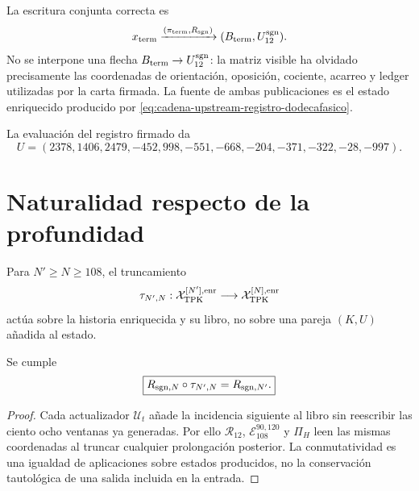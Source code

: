 La escritura conjunta correcta es
\begin{equation}
 x_{\rm term}
 \xrightarrow{(\pi_{\rm term},R_{\rm sgn})}
 (B_{\rm term},U_{12}^{\rm sgn}).
 \label{eq:doble-publicacion-terminal}
\end{equation}
No se interpone una flecha
\(B_{\rm term}\to U_{12}^{\rm sgn}\): la matriz visible ha olvidado
precisamente las coordenadas de orientación, oposición, cociente, acarreo y
ledger utilizadas por la carta firmada. La fuente de ambas publicaciones es
el estado enriquecido producido por \eqref{eq:cadena-upstream-registro-dodecafasico}.

La evaluación del registro firmado da
\begin{equation}
 \boxed{
 U=(2378,1406,2479,-452,998,-551,
 -668,-204,-371,-322,-28,-997).}
 \label{eq:vector-u-firmado-autonomo}
\end{equation}

\section{Naturalidad respecto de la profundidad}

Para \(N'\geq N\geq108\), el truncamiento
\begin{equation}
 \tau_{N',N}:
 \mathcal X_{\rm TPK}^{[N'],\rm enr}
 \longrightarrow\mathcal X_{\rm TPK}^{[N],\rm enr}
 \label{eq:truncamiento-preserva-ku-autonomo}
\end{equation}
actúa sobre la historia enriquecida y su libro, no sobre una pareja
\((K,U)\) añadida al estado.

\begin{theorem}
\label{thm:naturalidad-lector-firmado-autonomo}
Se cumple
\begin{equation}
 \boxed{
 R_{{\rm sgn},N}\circ\tau_{N',N}
 =R_{{\rm sgn},N'}.}
 \label{eq:cuadrado-naturalidad-lector-firmado}
\end{equation}
\end{theorem}

\begin{proof}
Cada actualizador \(\mathcal U_t\) añade la incidencia siguiente al libro
sin reescribir las ciento ocho ventanas ya generadas. Por ello
\(\mathcal R_{12}\), \(\mathcal E_{108}^{90,120}\) y \(\Pi_H\) leen las
mismas coordenadas al truncar cualquier prolongación posterior. La
conmutatividad es una igualdad de aplicaciones sobre estados producidos, no
la conservación tautológica de una salida incluida en la entrada.
\end{proof}

